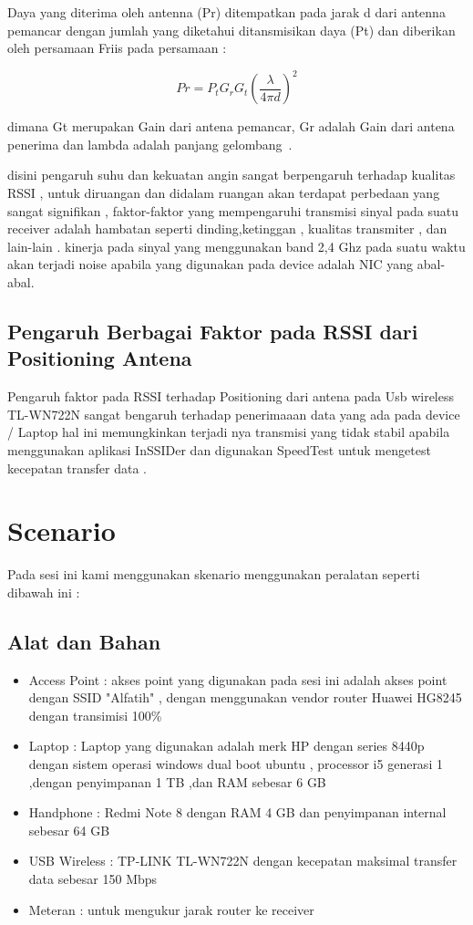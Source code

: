 \documentclass[conference]{IEEEtran}
\begin{document}
Daya yang diterima oleh antenna (Pr) ditempatkan pada jarak d
dari antenna pemancar dengan jumlah yang diketahui
ditansmisikan daya (Pt) dan diberikan oleh
persamaan Friis pada persamaan :

\begin{equation}
    Pr = P_t G_r G_t 
    \left( 
        \frac{\lambda}{4 \pi d}
    \right) ^2
\end{equation}

dimana Gt merupakan Gain dari antena pemancar, Gr
adalah Gain dari antena penerima  dan lambda adalah
panjang gelombang~. \cite{puspitasari2014analisis}

disini pengaruh suhu dan kekuatan angin sangat berpengaruh terhadap kualitas RSSI ,
untuk diruangan dan didalam ruangan akan terdapat perbedaan yang sangat signifikan , faktor-faktor
yang mempengaruhi transmisi sinyal pada suatu receiver adalah hambatan seperti dinding,ketinggan , kualitas transmiter , dan lain-lain .
kinerja pada sinyal yang menggunakan band 2,4 Ghz pada suatu waktu akan terjadi noise apabila yang digunakan pada device adalah NIC yang abal-abal. 

\subsection{Pengaruh Berbagai Faktor pada RSSI dari Positioning Antena}
Pengaruh faktor pada RSSI terhadap Positioning dari antena pada Usb wireless TL-WN722N sangat bengaruh terhadap penerimaaan data yang ada pada device / Laptop
hal ini memungkinkan terjadi nya transmisi yang tidak stabil apabila menggunakan aplikasi InSSIDer dan digunakan SpeedTest untuk mengetest kecepatan transfer data .

\section{Scenario}
Pada sesi ini kami menggunakan skenario menggunakan peralatan seperti dibawah ini :
\subsection{Alat dan Bahan}

\begin{itemize}
    \item Access Point : akses point yang digunakan pada sesi ini adalah akses point dengan SSID  "Alfatih" , dengan menggunakan vendor router Huawei HG8245 dengan transimisi 100\% 
    \item Laptop : Laptop yang digunakan adalah merk HP dengan series 8440p dengan sistem operasi windows dual boot ubuntu , processor i5 generasi 1 ,dengan penyimpanan 1 TB ,dan RAM sebesar 6 GB 
    \item Handphone : Redmi Note 8 dengan RAM 4 GB dan penyimpanan internal sebesar 64 GB 
    \item USB Wireless : TP-LINK TL-WN722N dengan kecepatan maksimal transfer data sebesar 150 Mbps
    \item Meteran : untuk mengukur jarak router ke receiver
\end{itemize}
\end{document}
